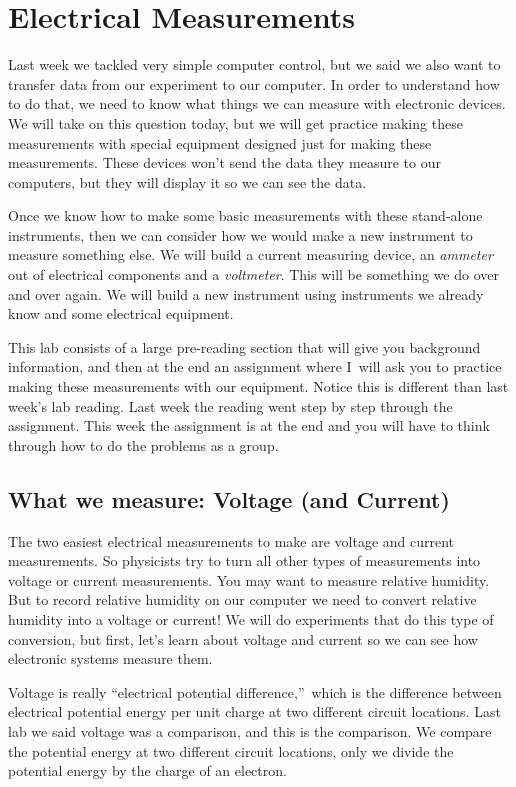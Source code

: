\chapter{Electrical Measurements}
Last week we tackled very simple computer control, but we said we also want
to transfer data from our experiment to our computer. In order to understand
how to do that, we need to know what things we can measure with electronic
devices. We will take on this question today, but we will get practice
making these measurements with special equipment designed just for making
these measurements. These devices won't send the data they measure to our
computers, but they will display it so we can see the data.

Once we know how to make some basic measurements with these stand-alone
instruments, then we can consider how we would make a new instrument to
measure something else. We will build a current measuring device, an \emph{%
ammeter} out of electrical components and a \emph{voltmeter}. This will be
something we do over and over again. We will build a new instrument using
instruments we already know and some electrical equipment.

This lab consists of a large pre-reading section that will give you
background information, and then at the end an assignment where I\ will ask
you to practice making these measurements with our equipment. Notice this is
different than last week's lab reading. Last week the reading went step by
step through the assignment. This week the assignment is at the end and you
will have to think through how to do the problems as a group.

\section{What we measure: Voltage (and Current)\label{Voltage Measurement
with Meter}}

The two easiest electrical measurements to make are voltage and current
measurements. So physicists try to turn all other types of measurements into
voltage or current measurements. You may want to measure relative humidity.
But to record relative humidity on our computer we need to convert relative
humidity into a voltage or current! We will do experiments that do this type
of conversion, but first, let's learn about voltage and current so we can
see how electronic systems measure them.

Voltage is really \textquotedblleft electrical potential
difference,\textquotedblright\ which is the difference between electrical
potential energy per unit charge at two different circuit locations. Last
lab we said voltage was a comparison, and this is the comparison. We compare
the potential energy at two different circuit locations, only we divide the
potential energy by the charge of an electron.

